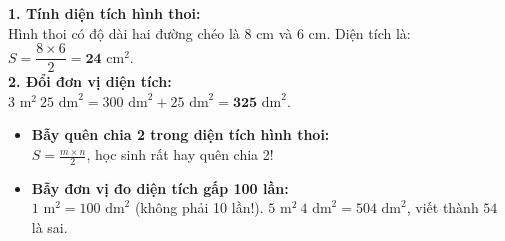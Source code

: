 \documentclass[14pt,a4paper,oneside]{extbook}
\begin{document}
\vspace{-2.5mm}
\noindent
\begin{minipage}[t]{0.49\textwidth}\vspace{0pt}
\begin{tcolorbox}[
  enhanced,
  colback=green!4!white,
  colframe=green!60!black,
  arc=2mm, boxrule=0.8pt,
  left=2mm, right=2mm, top=1.8mm, bottom=1.8mm,
  title={\footnotesize\bfseries\color{white}\faCheckCircle\ Ví dụ thực hành chuẩn mực}
]
{\footnotesize
\textbf{1. Tính diện tích hình thoi:}\\
Hình thoi có độ dài hai đường chéo là $8\text{ cm}$ và $6\text{ cm}$. Diện tích là:\\
$S = \dfrac{8 \times 6}{2} = \mathbf{24}\text{ cm}^2$.\\
\textbf{2. Đổi đơn vị diện tích:}\\
$3\text{ m}^2~ 25\text{ dm}^2 = 300\text{ dm}^2 + 25\text{ dm}^2 = \mathbf{325}\text{ dm}^2$.
}
\end{tcolorbox}
\end{minipage}
\hfill
\begin{minipage}[t]{0.49\textwidth}\vspace{0pt}
\begin{tcolorbox}[
  enhanced,
  colback=red!4!white,
  colframe=red!70!black,
  arc=2mm, boxrule=0.8pt,
  left=2mm, right=2mm, top=1.8mm, bottom=1.8mm,
  title={\footnotesize\bfseries\color{white}\faExclamationTriangle\ Mẹo tránh bẫy trắc nghiệm}
]
{\footnotesize
\begin{itemize}\setlength{\itemsep}{1.5pt}\setlength{\leftskip}{-2.5mm}
  \item \textbf{Bẫy quên chia 2 trong diện tích hình thoi:}\\
  $S = \frac{m \times n}{2}$, học sinh rất hay quên chia 2!
  \item \textbf{Bẫy đơn vị đo diện tích gấp 100 lần:}\\
  $1\text{ m}^2 = 100\text{ dm}^2$ (không phải 10 lần!). $5\text{ m}^2~ 4\text{ dm}^2 = 504\text{ dm}^2$, viết thành $54$ là sai.
\end{itemize}
}
\end{tcolorbox}
\end{minipage}
\end{document}
